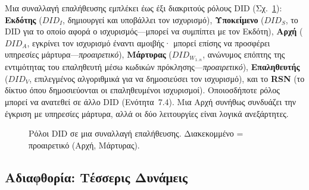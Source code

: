 \documentclass[11pt,a4paper,twocolumn]{article}
\begin{document}
Μια συναλλαγή επαλήθευσης εμπλέκει έως έξι διακριτούς ρόλους DID (Σχ.~\ref{fig:roles}): \textbf{Εκδότης} ($DID_I$, δημιουργεί και υποβάλλει τον ισχυρισμό), \textbf{Υποκείμενο} ($DID_S$, το DID για το οποίο αφορά ο ισχυρισμός---μπορεί να συμπίπτει με τον Εκδότη), \textbf{Αρχή} ($DID_A$, εγκρίνει τον ισχυρισμό έναντι αμοιβής· μπορεί επίσης να προσφέρει υπηρεσίες μάρτυρα---\emph{προαιρετικό}), \textbf{Μάρτυρας} ($DID_{W_{1..n}}$, ανώνυμος επόπτης της εντιμότητας του επαληθευτή μέσω κωδικών πρόκλησης---\emph{προαιρετικό}), \textbf{Επαληθευτής} ($DID_V$, επιλεγμένος αλγοριθμικά για να δημοσιεύσει τον ισχυρισμό), και το \textbf{RSN} (το δίκτυο όπου δημοσιεύονται οι επαληθευμένοι ισχυρισμοί). Οποιοσδήποτε ρόλος μπορεί να ανατεθεί σε άλλο DID (Ενότητα~7.4). Μια Αρχή συνήθως συνδυάζει την έγκριση με υπηρεσίες μάρτυρα, αλλά οι δύο λειτουργίες είναι λογικά ανεξάρτητες.

\begin{figure}[ht]
\centering
{}
\caption{Ρόλοι DID σε μια συναλλαγή επαλήθευσης. Διακεκομμένο = προαιρετικό (Αρχή, Μάρτυρας).}
\label{fig:roles}
\end{figure}

\subsection{Αδιαφθορία: Τέσσερις Δυνάμεις}
\end{document}
